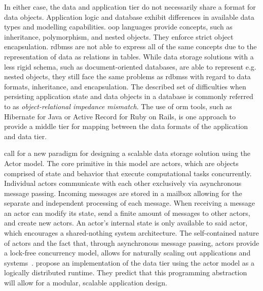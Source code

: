  In either case, the data and application tier do not necessarily share a format for data objects.
  Application logic and database exhibit differences in available data types and modelling capabilities.
  \Gls{oop} languages provide concepts, such as inheritance, polymorphism, and nested objects.
  They enforce strict object encapsulation.
  \Glspl{rdbms} are not able to express all of the same concepts due to the representation of data as relations in tables. %
  While data storage solutions with a less rigid schema, such as document-oriented databases, are able to represent e.g. nested objects, they still face the same problems as \glspl{rdbms} with regard to data formats, inheritance, and encapsulation.
  The described set of difficulties when persisting application state and data objects in a database is commonly referred to as \textit{object-relational impedance mismatch}.
  The use of \gls{orm} tools, such as Hibernate for Java or Active Record for Ruby on Rails, is one approach to provide a middle tier for mapping between the data formats of the application and data tier.

   call for a new paradigm for designing a scalable data storage solution using the Actor model.
  The core primitive in this model are actors, which are objects comprised of state and behavior that execute computational tasks concurrently.
  Individual actors communicate with each other exclusively via asynchronous message passing.
  Incoming messages are stored in a mailbox allowing for the separate and independent processing of each message.
  When receiving a message an actor can modify its state, send a finite amount of messages to other actors, and create new actors.
  An actor's internal state is only available to said actor, which encourages a shared-nothing system architecture.
  The self-contained nature of actors and the fact that, through asynchronous message passing, actors provide a lock-free concurrency model, allows for naturally scaling out applications and systems~\cite{vernon2015reactive}.
   propose an implementation of the data tier using the actor model as a logically distributed runtime.
  They predict that this programming abstraction will allow for a modular, scalable application design.

